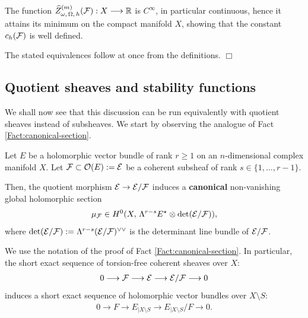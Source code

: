 \documentclass[12pt]{article}
\begin{document}
 The function $\widehat{Z}_{\omega,\,\Omega,\,h}^{(m)}({\cal F}):X\longrightarrow\mathbb{R}$ is $C^\infty$, in particular continuous, hence it attains its minimum on the compact manifold $X$, showing that the constant $c_h({\cal F})$ is well defined.

The stated equivalences follow at once from the definitions. \hfill $\Box$

\subsection{Quotient sheaves and stability functions}\label{subsection:quotient-sheaves_W-functions}


We shall now see that this discussion can be run equivalently with quotient sheaves instead of subsheaves. We start by observing the analogue of Fact \ref{Fact:canonical-section}.

\begin{Fact}\label{Fact:canonical-section_quotient} Let $E$ be a holomorphic vector bundle of rank $r\geq 1$ on an $n$-dimensional complex manifold $X$. Let ${\cal F}\subset{\cal O}(E):={\cal E}$ be a coherent subsheaf of rank $s\in\{1,\dots , r-1\}$.

  Then, the quotient morphism ${\cal E}\to{\cal E}/{\cal F}$ induces a {\bf canonical} non-vanishing global holomorphic section \begin{eqnarray*}\mu_{{\cal F}}\in H^0(X,\,\Lambda^{r-s} E^\star\otimes\det({\cal E}/{\cal F})),\end{eqnarray*} where $\det({\cal E}/{\cal F}):=\Lambda^{r-s}({\cal E}/{\cal F})^{\vee\vee}$ is the determinant line bundle of ${\cal E}/{\cal F}$.

\end{Fact}      

 We use the notation of the proof of Fact \ref{Fact:canonical-section}. In particular, the short exact sequence of torsion-free coherent sheaves over $X$: \begin{eqnarray*}0\longrightarrow{\cal F}\longrightarrow{\cal E}\longrightarrow{\cal E}/{\cal F}\longrightarrow 0\end{eqnarray*} induces a short exact sequence of holomorphic vector bundles over $X\setminus S$: \begin{eqnarray*}0\longrightarrow F\longrightarrow E_{|X\setminus S}\longrightarrow E_{|X\setminus S}/F\longrightarrow 0.\end{eqnarray*}
\end{document}
